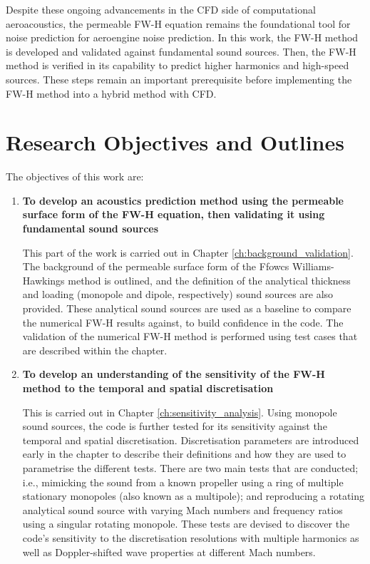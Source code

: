 Despite these ongoing advancements in the CFD side of computational aeroacoustics, the permeable FW-H equation remains the foundational tool for noise prediction for aeroengine noise prediction. In this work, the FW-H method is developed and validated against fundamental sound sources. Then, the FW-H method is verified in its capability to predict higher harmonics and high-speed sources. These steps remain an important prerequisite before implementing the FW-H method into a hybrid method with CFD.

\section{Research Objectives and Outlines} \label{subsec:objective_outline}
The objectives of this work are:
\begin{enumerate}
    \item \textbf{To develop an acoustics prediction method using the permeable surface form of the FW-H equation, then validating it using fundamental sound sources}
    
    This part of the work is carried out in Chapter \ref{ch:background_validation}. The background of the permeable surface form of the Ffowcs Williams-Hawkings method is outlined, and the definition of the analytical thickness and loading (monopole and dipole, respectively) sound sources are also provided. These analytical sound sources are used as a baseline to compare the numerical FW-H results against, to build confidence in the code. The validation of the numerical FW-H method is performed using test cases that are described within the chapter.

    \item \textbf{To develop an understanding of the sensitivity of the FW-H method to the temporal and spatial discretisation}
    
    This is carried out in Chapter \ref{ch:sensitivity_analysis}. Using monopole sound sources, the code is further tested for its sensitivity against the temporal and spatial discretisation. Discretisation parameters are introduced early in the chapter to describe their definitions and how they are used to parametrise the different tests. There are two main tests that are conducted; i.e., mimicking the sound from a known propeller using a ring of multiple stationary monopoles (also known as a multipole); and reproducing a rotating analytical sound source with varying Mach numbers and frequency ratios using a singular rotating monopole. These tests are devised to discover the code's sensitivity to the discretisation resolutions with multiple harmonics as well as Doppler-shifted wave properties at different Mach numbers.


\end{enumerate}
